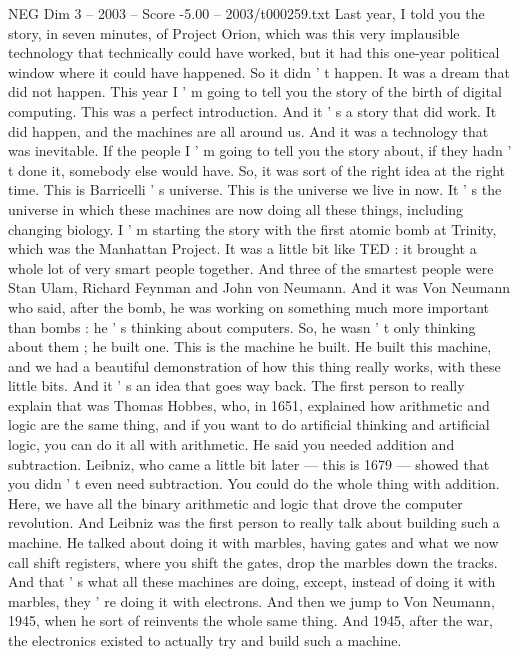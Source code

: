 \begin{textsample}{NEG Dim 3 – 2003 – Score -5.00 – 2003/t000259.txt}  \label{ex:f3_neg_009}
Last year, I told you the story, in seven minutes, of Project Orion, which was this very implausible technology that technically could have worked, but it had this one-year political window where it could have happened.
So it didn ' t happen.
It was a dream that did not happen.
This year I ' m going to tell you the story of the birth of digital computing.
This was a perfect introduction.
And it ' s a story that did work.
It did happen, and the machines are all around us.
And it was a technology that was inevitable.
If the people I ' m going to tell you the story about, if they hadn ' t done it, somebody else would have.
So, it was sort of the right idea at the right time.
This is Barricelli ' s universe.
This is the universe we live in now.
It ' s the universe in which these machines are now doing all these things, including changing biology.
I ' m starting the story with the first atomic bomb at Trinity, which was the Manhattan Project.
It was a little bit like TED : it brought a whole lot of very smart people together.
And three of the smartest people were Stan Ulam, Richard Feynman and John von Neumann.
And it was Von Neumann who said, after the bomb, he was working on something much more important than bombs : he ' s thinking about computers.
So, he wasn ' t only thinking about them ; he built one.
This is the machine he built.
He built this machine, and we had a beautiful demonstration of how this thing really works, with these little bits.
And it ' s an idea that goes way back.
The first person to really explain that was Thomas Hobbes, who, in 1651, explained how arithmetic and logic are the same thing, and if you want to do artificial thinking and artificial logic, you can do it all with arithmetic.
He said you needed addition and subtraction.
Leibniz, who came a little bit later — this is 1679 — showed that you didn ' t even need subtraction.
You could do the whole thing with addition.
Here, we have all the binary arithmetic and logic that drove the computer revolution.
And Leibniz was the first person to really talk about building such a machine.
He talked about doing it with marbles, having gates and what we now call shift registers, where you shift the gates, drop the marbles down the tracks.
And that ' s what all these machines are doing, except, instead of doing it with marbles, they ' re doing it with electrons.
And then we jump to Von Neumann, 1945, when he sort of reinvents the whole same thing.
And 1945, after the war, the electronics existed to actually try and build such a machine.

\end{textsample}
